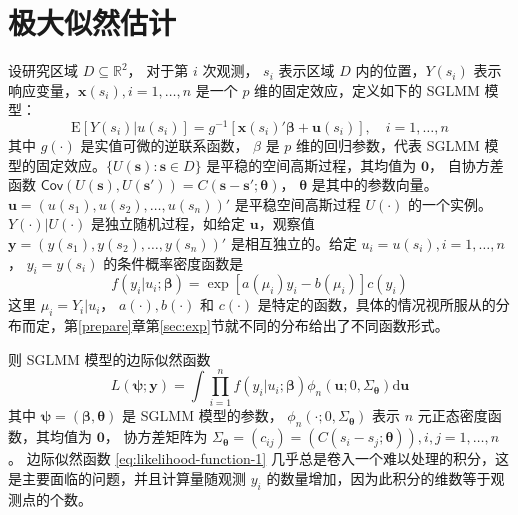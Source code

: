 \documentclass[12pt,a4paper,UTF8,twoside]{book}
\theoremstyle{definition}
\theoremstyle{definition}
\theoremstyle{definition}
\theoremstyle{remark}
\begin{document}
\hypertarget{sec:mle}{%
\section{极大似然估计}\label{sec:mle}}

设研究区域 \(D \subseteq \mathbb{R}^2\)， 对于第 \(i\) 次观测， \(s_i\)
表示区域 \(D\) 内的位置，\(Y(s_i)\)
表示响应变量，\(\mathbf{x}(s_i), i = 1, \ldots, n\) 是一个 \(p\)
维的固定效应，定义如下的 SGLMM 模型：
\[ \mathrm{E}[Y(s_i)|u(s_i)] = g^{-1}[\mathbf{x}(s_i)'\boldsymbol{\beta} + \mathbf{u}(s_i)], \quad i = 1, \ldots, n \]
\noindent 其中 \(g(\cdot)\) 是实值可微的逆联系函数， \(\beta\) 是 \(p\)
维的回归参数，代表 SGLMM
模型的固定效应。\(\{U(\mathbf{s}): \mathbf{s} \in D\}\)
是平稳的空间高斯过程，其均值为 \(\mathbf{0}\)， 自协方差函数
\(\mathsf{Cov}(U(\mathbf{s}),U(\mathbf{s}')) = C(\mathbf{s} - \mathbf{s}'; \boldsymbol{\theta})\)，
\(\boldsymbol{\theta}\) 是其中的参数向量。
\(\mathbf{u} = (u(s_1),u(s_2),\ldots,u(s_n))'\) 是平稳空间高斯过程
\(U(\cdot)\) 的一个实例。\(Y(\cdot)|U(\cdot)\) 是独立随机过程，如给定
\(\mathbf{u}\)，观察值 \(\mathbf{y} = (y(s_1),y(s_2),\ldots,y(s_n))'\)
是相互独立的。给定 \(u_i = u(s_i), i = 1, \ldots, n\)， \(y_i = y(s_i)\)
的条件概率密度函数是
\[f(y_i|u_i;\boldsymbol{\beta}) = \exp[a(\mu_i)y_i - b(\mu_i)]c(y_i)\]
这里 \(\mu_i = Y_i|u_i\)， \(a(\cdot),b(\cdot)\) 和 \(c(\cdot)\)
是特定的函数，具体的情况视所服从的分布而定，第\ref{prepare}章第\ref{sec:exp}节就不同的分布给出了不同函数形式。

\noindent 则 SGLMM 模型的边际似然函数 \begin{equation}
L(\boldsymbol{\psi};\mathbf{y}) = \int \prod_{i=1}^{n} f(y_i|u_i;\boldsymbol{\beta})\phi_{n}(\mathbf{u};0,\Sigma_{\boldsymbol{\theta}})\mathrm{d}\mathbf{u} \label{eq:likelihood-function-1}
\end{equation} \noindent 其中
\(\boldsymbol{\psi} = (\boldsymbol{\beta},\boldsymbol{\theta})\) 是
SGLMM 模型的参数， \(\phi_{n}(\cdot;0,\Sigma_{\boldsymbol{\theta}})\)
表示 \(n\) 元正态密度函数，其均值为 \(\mathbf{0}\)， 协方差矩阵为
\(\Sigma_{\boldsymbol{\theta}} = (c_{ij}) = (C(s_i - s_j; \boldsymbol{\theta})), i,j = 1, \ldots, n\)。
边际似然函数 \eqref{eq:likelihood-function-1}
几乎总是卷入一个难以处理的积分，这是主要面临的问题，并且计算量随观测
\(y_i\) 的数量增加，因为此积分的维数等于观测点的个数。
\end{document}
